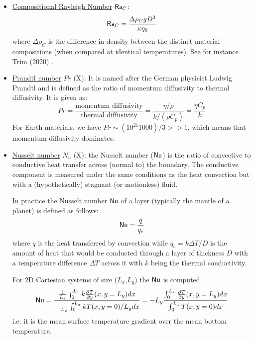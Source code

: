 \begin{itemize}
\item \underline{Compositional Rayleigh Number} ${\mathsf{Ra}}_C$:  
\[
{\mathsf{Ra}}_C= \frac{\Delta \rho_C  g  D^3}{\kappa \eta_0}
\]
where $\Delta \rho_C$ is the difference in density between the distinct material compositions
(when compared at identical temperatures). See for instance Trim \etal (2020) \cite{trlb20}.

\item \underline{Prandtl number} $Pr$ (X):  
It is named after the German physicist 
Ludwig Prandtl and is defined as the ratio of momentum diffusivity to thermal diffusivity. 
It is given as: 
\[
Pr = \frac{\text{momentum diffusivity}}{\text{thermal diffusivity}} = \frac{\eta/\rho}{k/(\rho C_p)}= \frac{\eta C_p}{k}
\]
For Earth materials, we have $Pr \sim (10^{21} 1000)/3 >> 1$, 
which means that momentum diffusivity dominates.

\item \underline{Nusselt number} $N_u$ (X):   
the Nusselt number (${\mathsf{Nu}}$) 
is the ratio of convective to conductive heat transfer across (normal to) the boundary. 
The conductive component is measured under the same conditions as the heat convection 
but with a (hypothetically) stagnant (or motionless) fluid.

In practice the Nusselt number ${\mathsf{Nu}}$ of a layer (typically the mantle of a planet) is defined as follows:
\begin{equation}
{\mathsf{Nu}} = \frac{q}{q_c}
\end{equation} 
where $q$ is the heat transferred by convection while $q_c=k \Delta T /D$ 
is the amount of heat that would be conducted through a layer of
thickness $D$ with a temperature difference $\Delta T$ across it with 
$k$ being the thermal conductivity.

For 2D Cartesian systems of size ($L_x$,$L_y$) the ${\mathsf{Nu}}$ is computed \cite{blbc89}
\[
{\mathsf{Nu}} = 
\frac{\frac{1}{L_x}\int_{0}^{L_x} k \frac{\partial T}{\partial y}(x,y=L_y) dx }
{-\frac{1}{L_x}\int_0^{L_x} k T(x,y=0) /L_y dx}
=-L_y \frac{\int_{0}^{L_x} \frac{\partial T}{\partial y}(x,y=L_y) dx }{\int_0^{L_x} T(x,y=0) dx}
\]
i.e. it is the mean surface temperature gradient
over the mean bottom temperature.



\end{itemize}
